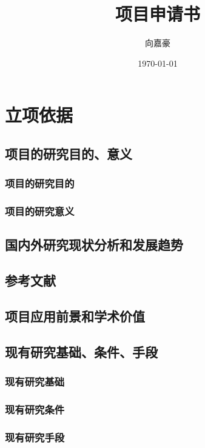 \documentclass{ctexart}
\begin{document}
\title{项目申请书}
\author{向嘉豪}
\date{\today}

\maketitle


\section{立项依据}
\subsection{项目的研究目的、意义}

\subsubsection{项目的研究目的}

\subsubsection{项目的研究意义}

\subsection{国内外研究现状分析和发展趋势}

\subsection{参考文献}
\subsection{项目应用前景和学术价值}
\subsection{现有研究基础、条件、手段}
\subsubsection{现有研究基础}
\subsubsection{现有研究条件}
\subsubsection{现有研究手段}
\end{document}
